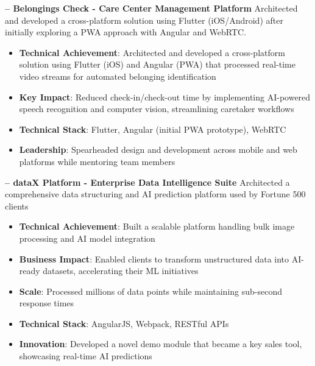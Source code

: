 \texthr{}


\begin{sectionContainer}
	\vspace{0.4em}\noindent\large\textbf{– Belongings Check - Care Center Management Platform}
	\vspace{0.8em} \newline
	\noindent Architected and developed a cross-platform solution using Flutter (iOS/Android) after initially exploring a PWA approach with Angular and WebRTC. 
	\begin{itemize}[leftmargin=*, nosep, itemsep=0.4em, before=\vspace{0.6em}, after=\vspace{0.8em}, label={}]
		\item \textbf{Technical Achievement}: Architected and developed a cross-platform solution using Flutter (iOS) and Angular (PWA) that processed real-time video streams for automated belonging identification
		\item \textbf{Key Impact}: Reduced check-in/check-out time by implementing AI-powered speech recognition and computer vision, streamlining caretaker workflows
		\item \textbf{Technical Stack}: Flutter, Angular (initial PWA prototype), WebRTC
		\item \textbf{Leadership}: Spearheaded design and development across mobile and web platforms while mentoring team members
	\end{itemize}
\end{sectionContainer}

\begin{sectionContainer}
	\vspace{0.4em}\noindent\large\textbf{– dataX Platform - Enterprise Data Intelligence Suite}
	\vspace{0.8em} \newline
	\noindent Architected a comprehensive data structuring and AI prediction platform used by Fortune 500 clients
	\begin{itemize}[leftmargin=*, nosep, itemsep=0.4em, before=\vspace{0.6em}, after=\vspace{0.8em}, label={}]
		\item \textbf{Technical Achievement}: Built a scalable platform handling bulk image processing and AI model integration
		\item \textbf{Business Impact}: Enabled clients to transform unstructured data into AI-ready datasets, accelerating their ML initiatives
		\item \textbf{Scale}: Processed millions of data points while maintaining sub-second response times
		\item \textbf{Technical Stack}:  AngularJS, Webpack, RESTful APIs
		\item \textbf{Innovation}: Developed a novel demo module that became a key sales tool, showcasing real-time AI predictions
	\end{itemize}
\end{sectionContainer}

